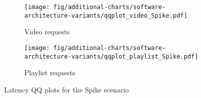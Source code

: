 \begin{landscape}
	\begin{figure}[p]
		\centering
		\begin{subfigure}[b]{0.7\columnwidth}
			\centering
			\texttt{[image: fig/additional-charts/software-architecture-variants/qqplot\_video\_Spike.pdf]}
			\caption{Video requests}
			\label{fig:additional-charts--qqplot-video-spike}
			\vspace{0.75cm}
		\end{subfigure}
		\begin{subfigure}[b]{0.7\columnwidth}
			\centering
			\texttt{[image: fig/additional-charts/software-architecture-variants/qqplot\_playlist\_Spike.pdf]}
			\caption{Playlist requests}
			\label{fig:additional-charts--qqplot-playlist-spike}
		\end{subfigure}
		\caption{Latency QQ plots for the Spike scenario}
		\label{fig:additional-charts--qqplot-spike}
	\end{figure}
\end{landscape}
